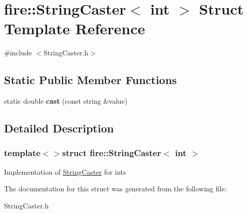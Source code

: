 \hypertarget{a00044}{}\section{fire\+:\+:String\+Caster$<$ int $>$ Struct Template Reference}
\label{a00044}


{\ttfamily \#include $<$String\+Caster.\+h$>$}

\subsection*{Static Public Member Functions}
\begin{DoxyCompactItemize}
\item 
\hypertarget{a00044_a62373040bdd4acb9e2c890d83829e22f}{}static double {\bfseries cast} (const string \&value)\label{a00044_a62373040bdd4acb9e2c890d83829e22f}

\end{DoxyCompactItemize}


\subsection{Detailed Description}
\subsubsection*{template$<$$>$struct fire\+::\+String\+Caster$<$ int $>$}

Implementation of \hyperlink{a00040}{String\+Caster} for ints 

The documentation for this struct was generated from the following file\+:\begin{DoxyCompactItemize}
\item 
String\+Caster.\+h\end{DoxyCompactItemize}

